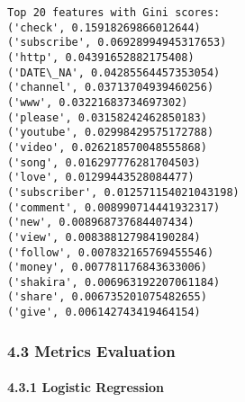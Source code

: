\documentclass[11pt]{article}
\begin{document}
    \begin{Verbatim}[commandchars=\\\{\}]
Top 20 features with Gini scores:
('check', 0.15918269866012644)
('subscribe', 0.06928994945317653)
('http', 0.04391652882175408)
('DATE\_NA', 0.04285564457353054)
('channel', 0.03713704939460256)
('www', 0.03221683734697302)
('please', 0.03158242462850183)
('youtube', 0.02998429575172788)
('video', 0.026218570048555868)
('song', 0.016297776281704503)
('love', 0.01299443528084477)
('subscriber', 0.012571154021043198)
('comment', 0.008990714441932317)
('new', 0.008968737684407434)
('view', 0.008388127984190284)
('follow', 0.007832165769455546)
('money', 0.007781176843633006)
('shakira', 0.006963192207061184)
('share', 0.006735201075482655)
('give', 0.006142743419464154)
    \end{Verbatim}

    \subsubsection{4.3 Metrics Evaluation}\label{metrics-evaluation}

    \paragraph{4.3.1 Logistic Regression}\label{logistic-regression}
\end{document}
